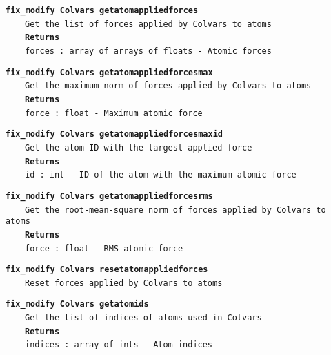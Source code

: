 \begin{mdexampleinput}{}
\texttt{\textbf{fix\_modify Colvars getatomappliedforces}}
\\
\-~~~~\texttt{Get the list of forces applied by Colvars to atoms}
\\
\-~~~~\texttt{\textbf{Returns}}
\\
\-~~~~\texttt{forces : array of arrays of floats - Atomic forces}
\end{mdexampleinput}
\begin{mdexampleinput}{}
\texttt{\textbf{fix\_modify Colvars getatomappliedforcesmax}}
\\
\-~~~~\texttt{Get the maximum norm of forces applied by Colvars to atoms}
\\
\-~~~~\texttt{\textbf{Returns}}
\\
\-~~~~\texttt{force : float - Maximum atomic force}
\end{mdexampleinput}
\begin{mdexampleinput}{}
\texttt{\textbf{fix\_modify Colvars getatomappliedforcesmaxid}}
\\
\-~~~~\texttt{Get the atom ID with the largest applied force}
\\
\-~~~~\texttt{\textbf{Returns}}
\\
\-~~~~\texttt{id : int - ID of the atom with the maximum atomic force}
\end{mdexampleinput}
\begin{mdexampleinput}{}
\texttt{\textbf{fix\_modify Colvars getatomappliedforcesrms}}
\\
\-~~~~\texttt{Get the root-mean-square norm of forces applied by Colvars to atoms}
\\
\-~~~~\texttt{\textbf{Returns}}
\\
\-~~~~\texttt{force : float - RMS atomic force}
\end{mdexampleinput}
\begin{mdexampleinput}{}
\texttt{\textbf{fix\_modify Colvars resetatomappliedforces}}
\\
\-~~~~\texttt{Reset forces applied by Colvars to atoms}
\end{mdexampleinput}
\begin{mdexampleinput}{}
\texttt{\textbf{fix\_modify Colvars getatomids}}
\\
\-~~~~\texttt{Get the list of indices of atoms used in Colvars}
\\
\-~~~~\texttt{\textbf{Returns}}
\\
\-~~~~\texttt{indices : array of ints - Atom indices}
\end{mdexampleinput}
